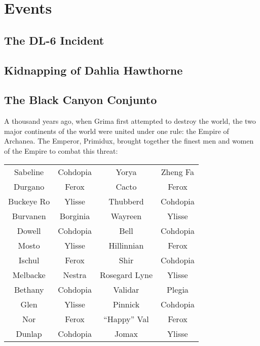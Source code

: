 
\section{Events}
\subsection{The DL-6 Incident}
\label{events:dl6}


\subsection{Kidnapping of Dahlia Hawthorne}
\label{events:kidnapdh}

\subsection{The Black Canyon Conjunto}
\label{events:bcc}
A thousand years ago, when Grima first attempted to destroy the world, the two major continents of the world were united under one rule: the Empire of Archanea. The Emperor, Primidux, brought together the finest men and women of the Empire to combat this threat:\\
\begin{tabular}{c c|c c}
Sabeline & Cohdopia & Yorya & Zheng Fa \\
Durgano & Ferox & Cacto & Ferox \\
Buckeye Ro & Ylisse & Thubberd & Cohdopia\\
Burvanen & Borginia & Wayreen & Ylisse\\
Dowell & Cohdopia & Bell & Cohdopia \\
Mosto & Ylisse & Hillinnian & Ferox\\
Ischul & Ferox & Shir  & Cohdopia \\
Melbacke & Nestra & Rosegard Lyne & Ylisse \\
Bethany & Cohdopia & Validar & Plegia \\
Glen & Ylisse & Pinnick & Cohdopia\\
Nor & Ferox & ``Happy'' Val & Ferox \\
Dunlap & Cohdopia & Jomax & Ylisse \\
\end{tabular}\\

